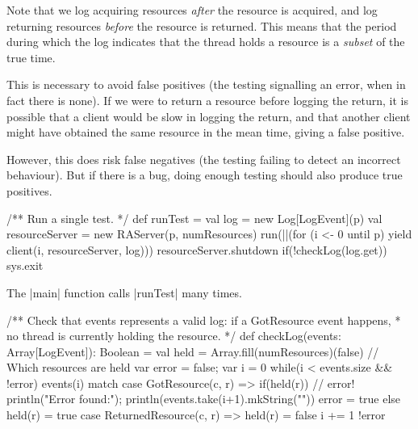 \begin{slide}

Note that we log acquiring resources \emph{after} the resource is acquired,
and log returning resources \emph{before} the resource is returned.  This
means that the period during which the log indicates that the thread holds a
resource is a \emph{subset} of the true time.

This is necessary to avoid false positives (the testing signalling an error,
when in fact there is none).  If we were to return a resource before logging
the return, it is possible that a client would be slow in logging the return,
and that another client might have obtained the same resource in the mean
time, giving a false positive.

However, this does risk false negatives (the testing failing to detect an
incorrect behaviour).  But if there is a bug, doing enough testing should also
produce true positives. 
\end{slide}


\begin{slide}

\begin{scala}
  /** Run a single test. */
  def runTest = {
    val log = new Log[LogEvent](p)
    val resourceServer = new RAServer(p, numResources)
    run(||(for (i <- 0 until p) yield client(i, resourceServer, log)))
    resourceServer.shutdown
    if(!checkLog(log.get)) sys.exit
  }
\end{scala}

The |main| function calls |runTest| many times. 
\end{slide}


\begin{slide}
\begin{scala}
  /** Check that events represents a valid log: if a GotResource event happens,
    * no thread is currently holding the resource. */
  def checkLog(events: Array[LogEvent]): Boolean = {
    val held = Array.fill(numResources)(false)  // Which resources are held
    var error = false; var i = 0
    while(i < events.size && !error){
      events(i) match{
        case GotResource(c, r) =>
          if(held(r)){ // error!
            println("Error found:"); println(events.take(i+1).mkString("\n"))
            error = true
          }
          else held(r) = true
        case ReturnedResource(c, r) => held(r) = false
      }
      i += 1
    }
    !error
  }
\end{scala}
\end{slide}

